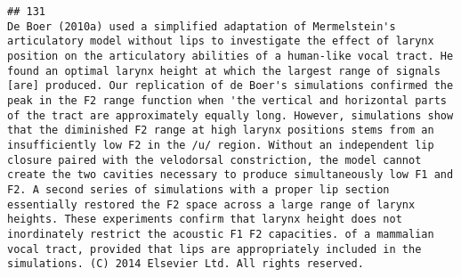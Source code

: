 \documentclass[
  english,
  man]{apa6}
\begin{document}
\begin{verbatim}
## 131                                                                                                                                                                                                                                                                                                                                                                                                                                                                                                                                                                                                                                                                                                                                                                                                                                                                                                                                                                                                                                                                                                                                                                                                                                                                                                                                                                                                                                                                                           De Boer (2010a) used a simplified adaptation of Mermelstein's articulatory model without lips to investigate the effect of larynx position on the articulatory abilities of a human-like vocal tract. He found an optimal larynx height at which the largest range of signals [are] produced. Our replication of de Boer's simulations confirmed the peak in the F2 range function when 'the vertical and horizontal parts of the tract are approximately equally long. However, simulations show that the diminished F2 range at high larynx positions stems from an insufficiently low F2 in the /u/ region. Without an independent lip closure paired with the velodorsal constriction, the model cannot create the two cavities necessary to produce simultaneously low F1 and F2. A second series of simulations with a proper lip section essentially restored the F2 space across a large range of larynx heights. These experiments confirm that larynx height does not inordinately restrict the acoustic F1 F2 capacities. of a mammalian vocal tract, provided that lips are appropriately included in the simulations. (C) 2014 Elsevier Ltd. All rights reserved.

\end{verbatim}
\end{document}
